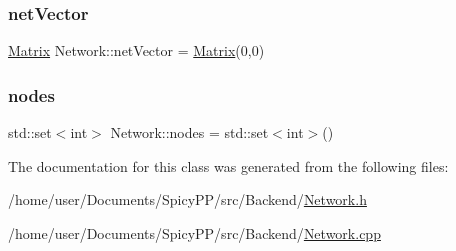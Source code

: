 \mbox{\label{classNetwork_a93b7a4e3182a75be5181d2f909235654}} 
\subsubsection{\texorpdfstring{net\+Vector}{netVector}}
{\footnotesize\ttfamily \hyperlink{classMatrix}{Matrix} Network\+::net\+Vector = \hyperlink{classMatrix}{Matrix}(0,0)\hspace{0.3cm}{\ttfamily [private]}}

\mbox{\label{classNetwork_a0e6aeccbefae639a173ebf2d759b34e0}} 
\subsubsection{\texorpdfstring{nodes}{nodes}}
{\footnotesize\ttfamily std\+::set$<$int$>$ Network\+::nodes = std\+::set$<$int$>$()\hspace{0.3cm}{\ttfamily [private]}}



The documentation for this class was generated from the following files\+:\begin{DoxyCompactItemize}
\item 
/home/user/\+Documents/\+Spicy\+P\+P/src/\+Backend/\hyperlink{Network_8h}{Network.\+h}\item 
/home/user/\+Documents/\+Spicy\+P\+P/src/\+Backend/\hyperlink{Network_8cpp}{Network.\+cpp}\end{DoxyCompactItemize}
